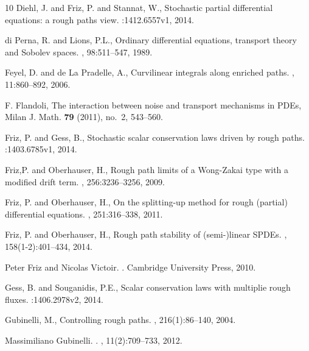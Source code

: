 \documentclass[11pt,a4paper]{amsart}
\numberwithin{equation}{section} %
\begin{document}
\begin{thebibliography}{10}
Diehl, J. and Friz, P. and Stannat, W.,
\newblock Stochastic partial differential equations: a rough paths view.
:1412.6557v1, 2014.

di Perna, R. and Lions, P.L.,
\newblock Ordinary differential equations, transport theory and {S}obolev spaces.
, 98:511--547, 1989.


Feyel, D. and de La Pradelle, A.,
\newblock Curvilinear integrals along enriched paths.
, 11:860--892, 2006.

  F. Flandoli, 
  \newblock The interaction between noise and transport mechanisms in PDEs, 
  \newblock Milan J. Math. {\bf 79} (2011), no.~2, 543--560. 

Friz, P. and Gess, B.,
\newblock Stochastic scalar conservation laws driven by rough paths.
:1403.6785v1, 2014.

Friz,P. and Oberhauser, H.,
\newblock Rough path limits of a {W}ong-{Z}akai type with a modified drift term.
, 256:3236--3256, 2009. 
 

Friz, P. and Oberhauser, H.,
\newblock On the splitting-up method for rough (partial) differential equations.
, 251:316--338, 2011.

Friz, P. and Oberhauser, H.,
\newblock Rough path stability of (semi-)linear SPDEs.
, 158(1-2):401--434, 2014.



Peter Friz and Nicolas Victoir.
.
\newblock Cambridge University Press, 2010.


Gess, B. and Souganidis, P.E.,
\newblock Scalar conservation laws with multiplie rough fluxes.
:1406.2978v2, 2014.

Gubinelli, M.,
\newblock Controlling rough paths.
, 216(1):86--140, 2004.


Massimiliano Gubinelli.
.
, 11(2):709--733, 2012.


\end{thebibliography}
\end{document}
